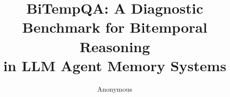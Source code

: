 \documentclass[11pt]{article}
\title{BiTempQA: A Diagnostic Benchmark for Bitemporal Reasoning\\ in LLM Agent Memory Systems}
\author{
  Anonymous
}
\begin{document}
\maketitle
\begin{abstract}

\end{abstract}













\appendix

\end{document}

